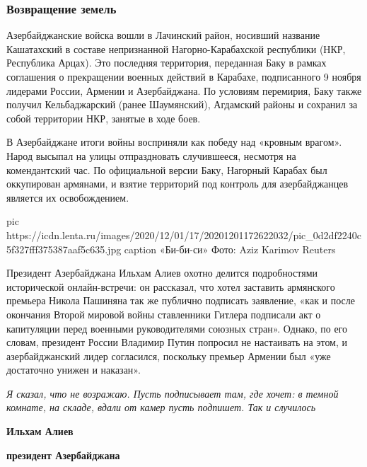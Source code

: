  
 
 
 
 
\subsubsection{Возвращение земель}

Азербайджанские войска вошли в Лачинский район, носивший название Кашатахский в
составе непризнанной Нагорно-Карабахской республики (НКР, Республика Арцах).
Это последняя территория, переданная Баку в рамках соглашения о прекращении
военных действий в Карабахе, подписанного 9 ноября лидерами России, Армении и
Азербайджана. По условиям перемирия, Баку также получил Кельбаджарский (ранее
Шаумянский), Агдамский районы и сохранил за собой территории НКР, занятые в
ходе боев.

В Азербайджане итоги войны восприняли как победу над «кровным врагом». Народ
высыпал на улицы отпраздновать случившееся, несмотря на комендантский час. По
официальной версии Баку, Нагорный Карабах был оккупирован армянами, и взятие
территорий под контроль для азербайджанцев является их освобождением.

\ifcmt
pic https://icdn.lenta.ru/images/2020/12/01/17/20201201172622032/pic_0d2df2240c5f327fff375387aaf5c635.jpg
caption «Би-би-си» Фото: Aziz Karimov Reuters 
\fi

Президент Азербайджана Ильхам Алиев охотно делится подробностями исторической
онлайн-встречи: он рассказал, что хотел заставить армянского премьера Никола
Пашиняна так же публично подписать заявление, «как и после окончания Второй
мировой войны ставленники Гитлера подписали акт о капитуляции перед военными
руководителями союзных стран». Однако, по его словам, президент России Владимир
Путин попросил не настаивать на этом, и азербайджанский лидер согласился,
поскольку премьер Армении был «уже достаточно унижен и наказан».

\begin{leftbar}
\emph{Я сказал, что не возражаю. Пусть подписывает там, где хочет: в темной комнате,
на складе, вдали от камер пусть подпишет. Так и случилось}\par
\textbf{Ильхам Алиев}\par
\textbf{президент Азербайджана}\par
\end{leftbar}

